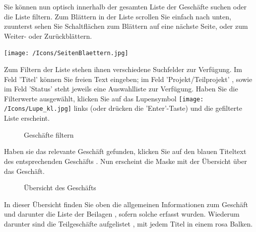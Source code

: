 Sie können nun optisch innerhalb der gesamten Liste der Geschäfte suchen oder die Liste filtern. Zum Blättern in der Liste scrollen Sie einfach nach unten, zuunterst sehen Sie Schaltflächen zum Blättern auf eine nächste Seite, oder zum Weiter- oder Zurückblättern.

\begin{center}
\texttt{[image: /Icons/SeitenBlaettern.jpg]}
\end{center}

Zum Filtern der Liste stehen ihnen verschiedene Suchfelder zur Verfügung. Im Feld 'Titel'  können Sie freien Text eingeben; im Feld 'Projekt/Teilprojekt' , sowie im Feld 'Status'  steht jeweils eine Auswahlliste zur Verfügung. Haben Sie die Filterwerte ausgewählt, klicken Sie auf das Lupensymbol \texttt{[image: /Icons/Lupe\_kl.jpg]}  links (oder drücken die 'Enter'-Taste) und die gefilterte Liste erscheint.

\begin{figure}[H]
\caption{Geschäfte filtern}
\end{figure}

Haben sie das relevante Geschäft gefunden, klicken Sie auf den blauen Titeltext des entsprechenden Geschäfts . Nun erscheint die Maske mit der Übersicht über das Geschäft.

\begin{figure}[H]
\caption{Übersicht des Geschäfts}
\end{figure}

In dieser Übersicht finden Sie oben die allgemeinen Informationen zum Geschäft  und darunter die Liste der Beilagen , sofern solche erfasst wurden. Wiederum darunter sind die Teilgeschäfte aufgelistet , mit jedem Titel in einem rosa Balken.

\vspace{\baselineskip}


